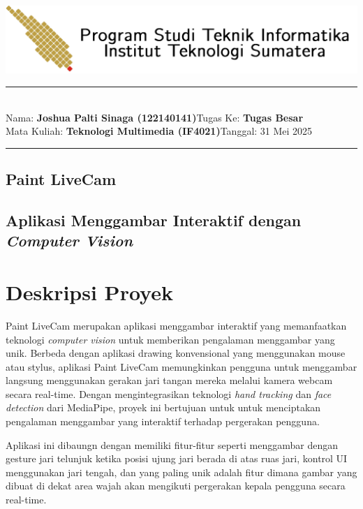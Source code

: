 \documentclass[11pt,a4paper]{article}
\newcommand{\student}{\textbf{Joshua Palti Sinaga (122140141)}}
\newcommand{\course}{\textbf{Teknologi Multimedia (IF4021)}}
\newcommand{\assignment}{\textbf{Tugas Besar}}
\begin{document}
\thispagestyle{empty}
\begin{center}
	\includegraphics[scale = 0.15]{Figure/ifitera-header.png}
	\vspace{0.1cm}
\end{center}
\noindent
\rule{17cm}{0.2cm}\\[0.3cm]
Nama: \student \hfill Tugas Ke: \assignment\\[0.1cm]
Mata Kuliah: \course \hfill Tanggal: 31 Mei 2025\\
\rule{17cm}{0.05cm}
\vspace{0.1cm}

\begin{center}
    \section*{Paint LiveCam}
    \subsection*{Aplikasi Menggambar Interaktif dengan \textit{Computer Vision}}
\end{center}
\vspace{0.5cm}

\section{Deskripsi Proyek}

Paint LiveCam merupakan aplikasi menggambar interaktif yang memanfaatkan teknologi \textit{computer vision} untuk memberikan pengalaman menggambar yang unik. Berbeda dengan aplikasi drawing konvensional yang menggunakan mouse atau stylus, aplikasi Paint LiveCam memungkinkan pengguna untuk menggambar langsung menggunakan gerakan jari tangan mereka melalui kamera webcam secara real-time. Dengan mengintegrasikan teknologi \textit{hand tracking} dan \textit{face detection} dari MediaPipe, proyek ini bertujuan untuk untuk menciptakan pengalaman menggambar yang interaktif terhadap pergerakan pengguna.

Aplikasi ini dibaungn dengan memiliki fitur-fitur seperti menggambar dengan gesture jari telunjuk ketika posisi ujung jari berada di atas ruas jari, kontrol UI menggunakan jari tengah, dan yang paling unik adalah fitur dimana gambar yang dibuat di dekat area wajah akan mengikuti pergerakan kepala pengguna secara real-time. 
\end{document}
